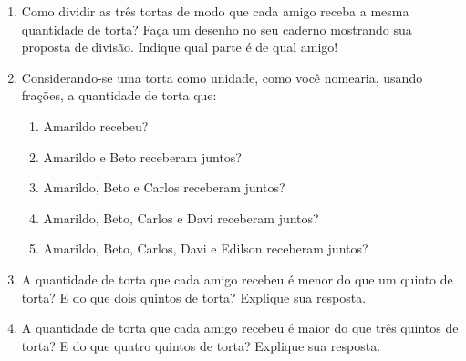 \documentclass[10 pt,usenames,dvipsnames, oneside]{article}
\begin{document}
\begin{enumerate} [label=\alph*)] %
  \item     Como dividir as três tortas de modo que cada amigo receba a mesma quantidade de torta? Faça um desenho no seu caderno mostrando sua proposta de divisão. Indique qual parte é de qual amigo!
  \item     Considerando-se uma torta como unidade, como você nomearia, usando frações, a quantidade de torta que:
\begin{enumerate} [label=\Roman*)] %
      \item         Amarildo recebeu?
      \item         Amarildo e Beto receberam juntos?
      \item         Amarildo, Beto e Carlos receberam juntos?
      \item         Amarildo, Beto, Carlos e Davi receberam juntos?
      \item         Amarildo, Beto, Carlos, Davi e Edilson receberam juntos?
\end{enumerate} %

  \item     A quantidade de torta que cada amigo recebeu é menor do que um quinto de torta? E do que dois quintos de torta? Explique sua resposta.
  \item     A quantidade de torta que cada amigo recebeu é maior do que três quintos de torta? E do que quatro quintos de torta? Explique sua resposta.
\end{enumerate} %

\ifdefined\prof
\end{document}
